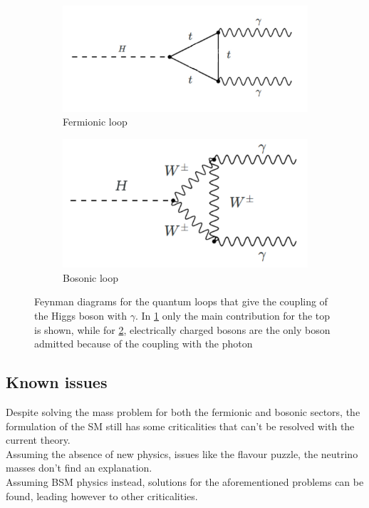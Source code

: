 \begin{figure}[ht]
    \centering
    \begin{subfigure}{0.4\textwidth}
        \includegraphics[width=\textwidth]{images/gamma_top.png}
        \caption{Fermionic loop}
        \label{gamma_top}
        \end{subfigure}
    \begin{subfigure}{0.4\textwidth}
        \includegraphics[width=\textwidth]{images/gammaW.png}
        \caption{Bosonic loop}
        \label{gamma_W}
        \end{subfigure}
    \caption{Feynman diagrams for the quantum loops that give the coupling of the Higgs boson with $\gamma$. In \ref{gamma_top} only the main contribution for the top is shown, while for \ref{gamma_W}, electrically charged bosons are the only boson admitted because of the coupling with the photon}
    \label{gamma_coupling}
\end{figure}
\subsection{Known issues}
Despite solving the mass problem for both the fermionic and bosonic sectors, the formulation of the SM still has some criticalities that can't be resolved with the current theory. \\
Assuming the absence of new physics, issues like the flavour puzzle, the neutrino masses don't find an explanation.\\
Assuming BSM physics instead, solutions for the aforementioned problems can be found, leading however to other criticalities. %
